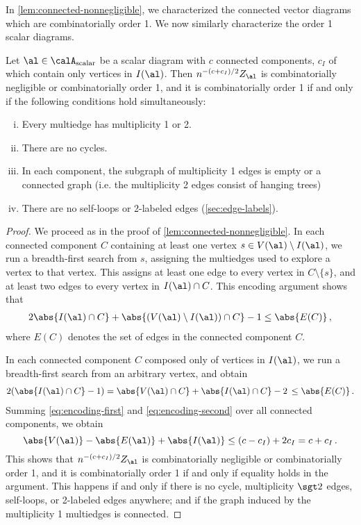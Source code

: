 \documentclass[12pt]{article}
\newcommand{\scalar}{\textnormal{scalar}}
\begin{document}
In \cref{lem:connected-nonnegligible}, we characterized the connected vector diagrams which are combinatorially order 1.
We now similarly characterize the order 1 scalar diagrams.
\begin{lemma}\label{lem:scalar-nonnegligible}
    Let $\al \in \calA_{\scalar}$ be a scalar diagram with $c$ connected components, $c_I$ of which contain only vertices in $I(\al)$.
Then 
$n^{-(c+c_I)/2}Z_\al$ is combinatorially negligible or combinatorially order 1, and it is combinatorially order 1 if and only if the following conditions hold simultaneously:
\begin{enumerate}[(i)]
    \item Every multiedge has multiplicity 1 or 2.
    \item There are no cycles.
    \item In each component, the subgraph of multiplicity 1 edges is empty or a connected graph
    (i.e. the multiplicity 2 edges consist of hanging trees)
    \item There are no self-loops or 2-labeled edges (\cref{sec:edge-labels}).
\end{enumerate}
\end{lemma}
\begin{proof}
    We proceed as in the proof of \cref{lem:connected-nonnegligible}.
    In each connected component $C$ containing at least one vertex $s\in V(\al)\setminus I(\al)$, we run a breadth-first search from $s$, assigning the multiedges used to explore a vertex to that vertex. This assigns at least one edge to every vertex in $C\setminus \{s\}$, and at least two edges to every vertex in $I(\al)\cap C$. This encoding argument shows that
    \begin{align}
        2\abs{I(\al)\cap C} + \abs{(V(\al)\setminus I(\al))\cap C}-1 \le \abs{E(C)}\,,\label{eq:encoding-first}
    \end{align}
    where $E(C)$ denotes the set of edges in the connected component $C$.
    
    In each connected component $C$ composed only of vertices in $I(\al)$, we run a breadth-first search from an arbitrary vertex, and obtain
    \begin{align}
        2(\abs{I(\al)\cap C}-1)=\abs{V(\al)\cap C}+\abs{I(\al)\cap C}-2\,\le \abs{E(C)}\,.\label{eq:encoding-second}
    \end{align}
    Summing \cref{eq:encoding-first} and \cref{eq:encoding-second} over all connected components, we obtain
    \[
        \abs{V(\al)}-\abs{E(\al)}+\abs{I(\al)}\le (c-c_I) + 2c_I  = c + c_I\,.
    \]
    This shows that $n^{-(c+c_I)/2} Z_\al$ is combinatorially negligible or combinatorially order 1, and it is combinatorially order 1 if and only if equality holds in the argument. This happens if and only if there is no cycle, multiplicity $\sgt 2$ edges, self-loops, or 2-labeled edges anywhere; and if the graph induced by the multiplicity 1 multiedges is connected.
\end{proof}
\end{document}
